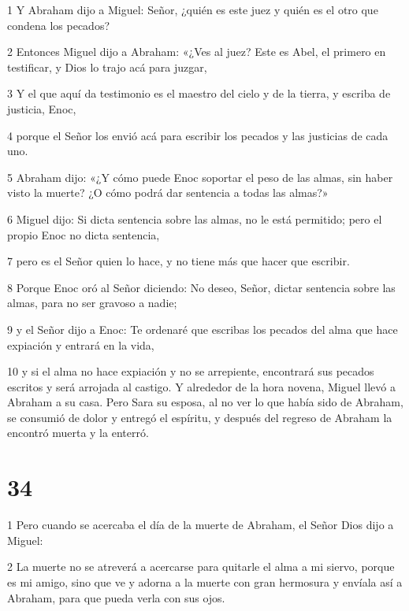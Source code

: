 \par 1 Y Abraham dijo a Miguel: Señor, ¿quién es este juez y quién es el otro que condena los pecados?

\par 2 Entonces Miguel dijo a Abraham: «¿Ves al juez? Este es Abel, el primero en testificar, y Dios lo trajo acá para juzgar,

\par 3 Y el que aquí da testimonio es el maestro del cielo y de la tierra, y escriba de justicia, Enoc,

\par 4 porque el Señor los envió acá para escribir los pecados y las justicias de cada uno.

\par 5 Abraham dijo: «¿Y cómo puede Enoc soportar el peso de las almas, sin haber visto la muerte? ¿O cómo podrá dar sentencia a todas las almas?»

\par 6 Miguel dijo: Si dicta sentencia sobre las almas, no le está permitido; pero el propio Enoc no dicta sentencia,

\par 7 pero es el Señor quien lo hace, y no tiene más que hacer que escribir.

\par 8 Porque Enoc oró al Señor diciendo: No deseo, Señor, dictar sentencia sobre las almas, para no ser gravoso a nadie;

\par 9 y el Señor dijo a Enoc: Te ordenaré que escribas los pecados del alma que hace expiación y entrará en la vida,

\par 10 y si el alma no hace expiación y no se arrepiente, encontrará sus pecados escritos y será arrojada al castigo. Y alrededor de la hora novena, Miguel llevó a Abraham a su casa. Pero Sara su esposa, al no ver lo que había sido de Abraham, se consumió de dolor y entregó el espíritu, y después del regreso de Abraham la encontró muerta y la enterró.

\chapter{34}

\par 1 Pero cuando se acercaba el día de la muerte de Abraham, el Señor Dios dijo a Miguel:

\par 2 La muerte no se atreverá a acercarse para quitarle el alma a mi siervo, porque es mi amigo, sino que ve y adorna a la muerte con gran hermosura y envíala así a Abraham, para que pueda verla con sus ojos.

